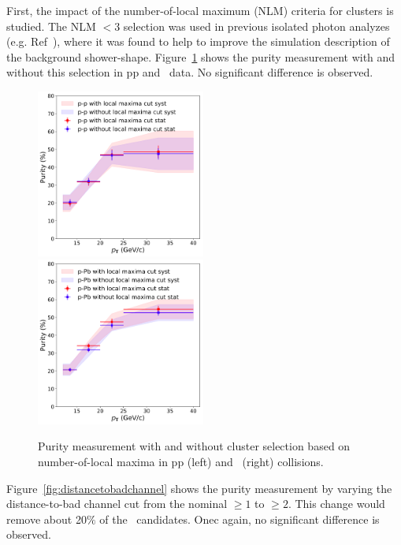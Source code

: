 First, the impact of the number-of-local maximum (NLM) criteria for clusters is studied. The NLM $<3$ selection was used in previous isolated photon analyzes (e.g. Ref~\cite{Acharya:2019jkx,Erwann}), where it was found to help to improve the simulation description of the background shower-shape. Figure~\ref{fig:numberoflocalmaxima} shows the purity measurement with and without this selection in pp and \pPb~data. No significant difference is observed.

\begin{figure}
	\center
	\includegraphics[width=0.495\textwidth]{G-H_New/dPhi_to_0/NLMvariation_pp.png}
	\includegraphics[width=0.495\textwidth]{Checks_Systematics/NLMvariation_pPb}
	\caption{Purity measurement with and without cluster selection based on number-of-local maxima in pp (left) and \pPb~(right) collisions.}
	\label{fig:numberoflocalmaxima}
\end{figure}

Figure~\ref{fig:distancetobadchannel} shows the purity measurement by varying the distance-to-bad channel cut from the nominal $\geq 1$ to $\geq 2$. This change would remove about 20$\%$ of the \gammaiso~candidates. Onec again, no significant difference is observed. 

